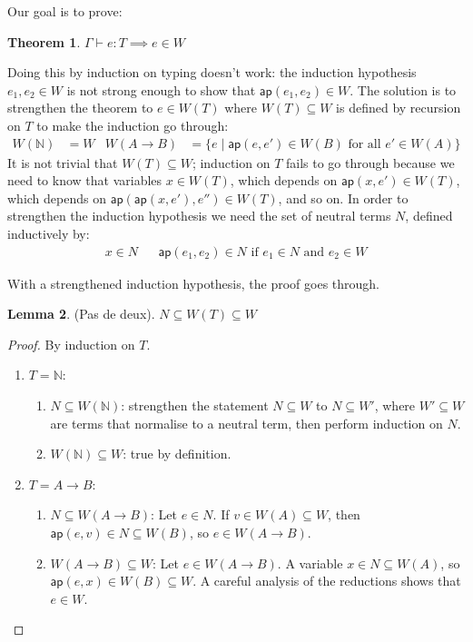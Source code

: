 \documentclass[a4paper, 11pt]{article}
\theoremstyle{definition}
\newtheorem{theorem}{Theorem}
\newtheorem{lemma}[theorem]{Lemma}
\newcommand{\ap}{\mathsf{ap}}
\newcommand{\G}{\Gamma}
\begin{document}
Our goal is to prove:

\begin{theorem}
  $\G \vdash e:T \implies e \in W$
\end{theorem}

Doing this by induction on typing doesn't work: the induction hypothesis $e_1,e_2 \in W$ is not strong enough to show that $\ap(e_1,e_2) \in W$. The solution is to strengthen the theorem to $e \in W(T)$ where $W(T) \subseteq W$ is defined by recursion on $T$ to make the induction go through:
\begin{align*}
  W(\mathbb{N}) &= W &
  W(A \to B) &= \{ e \mid \ap(e,e') \in W(B) \text{ for all } e' \in W(A) \}
\end{align*}
It is not trivial that $W(T) \subseteq W$; induction on $T$ fails to go through because we need to know that variables $x \in W(T)$, which depends on $\ap(x,e') \in W(T)$, which depends on $\ap(\ap(x,e'),e'') \in W(T)$, and so on. In order to strengthen the induction hypothesis we need the set of neutral terms $N$, defined inductively by:
\begin{align*}
  x \in N & &
  \ap(e_1,e_2) \in N \text{ if } e_1 \in N \text{ and } e_2 \in W
\end{align*}

With a strengthened induction hypothesis, the proof goes through.

\begin{lemma} (Pas de deux).
  $N \subseteq W(T) \subseteq W$
\end{lemma}
\begin{proof}
  By induction on $T$.
  \begin{enumerate}
    \item $T = \mathbb{N}$:
    \begin{enumerate}[label=(\alph*)]
      \item $N \subseteq W(\mathbb{N})$: strengthen the statement $N \subseteq W$ to $N \subseteq W'$, where $W' \subseteq W$ are terms that normalise to a neutral term, then perform induction on $N$.
      \item $W(\mathbb{N}) \subseteq W$: true by definition.
    \end{enumerate}
    \item $T = A \to B$:
    \begin{enumerate}[label=(\alph*)]
      \item $N \subseteq W(A \to B)$: Let $e \in N$. If $v \in W(A) \subseteq W$, then $\ap(e,v) \in N \subseteq W(B)$, so $e \in W(A \to B)$.
      \item $W(A \to B) \subseteq W$: Let $e \in W(A \to B)$. A variable $x \in N \subseteq W(A)$, so $\ap(e,x) \in W(B) \subseteq W$. A careful analysis of the reductions shows that $e \in W$.
    \end{enumerate}
  \end{enumerate}
\end{proof}
\end{document}
